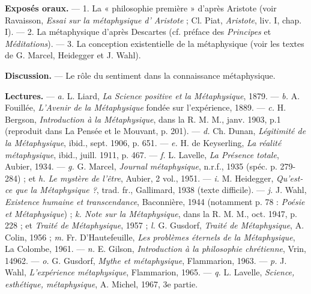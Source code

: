 {{\bf Exposés oraux.} — 1. La « philosophie première » d’après Aristote (voir
Ravaisson, {\it Essai sur la métaphysique d' Aristote} ; Cl. Piat, {\it Aristote}, liv. I,
chap. I). — 2. La métaphysique d’après Descartes (cf. préface des {\it Principes}
et {\it Méditations}). — 3. La conception existentielle de la métaphysique (voir
les textes de G. Marcel, Heidegger et J. Wahl).

{\bf Discussion.} — Le rôle du sentiment dans la connaissance métaphysique.

{\bf Lectures.} — {\it a.} L. Liard, {\it La Science positive et la Métaphysique}, 1879.
— {\it b.} A. Fouillée, {\it L'Avenir de la Métaphysique} fondée sur l'expérience,
1889. — {\it c.} H. Bergson, {\it Introduction à la Métaphysique}, dans la R. M. M.,
janv. 1903, p.1 (reproduit dans La Pensée et le Mouvant, p. 201). —
{\it d.} Ch. Dunan, {\it Légitimité de la Métaphysique}, ibid., sept. 1906, p. 651. —
{\it e.} H. de Keyserling, {\it La réalité métaphysique}, ibid., juill. 1911, p. 467. —
{\it f.} L. Lavelle, {\it La Présence totale}, Aubier, 1934. — {\it g.} G. Marcel, {\it Journal
métaphysique}, n.r.f., 1935 (spéc. p. 279-284) ; et {\it h. Le mystère de l'être}, Aubier,
2 vol., 1951. — {\it i.} M. Heidegger, {\it Qu'est-ce que la Métaphysique ?}, trad. fr.,
Gallimard, 1938 (texte difficile). — {\it j.} J. Wahl, {\it Existence humaine et
transcendance}, Baconnière, 1944 (notamment p. 78 : {\it Poésie et Métaphysique}) ;
{\it k. Note sur la Métaphysique}, dans la R. M. M., oct. 1947, p. 228 ; et {\it Traité
de Métaphysique}, 1957 ; {\it l.} G. Gusdorf, {\it Traité de Métaphysique}, A. Colin,
1956 ; {\it m.} Fr. D'Hautefeuille, {\it Les problèmes éternels de la Métaphysique},
La Colombe, 1961. — {\it n.} E. Gilson, {\it Introduction à la philosophie chrétienne},
Vrin, 14962. — {\it o.} G. Gusdorf, {\it Mythe et métaphysique}, Flammarion, 1963.
— {\it p.} J. Wahl, {\it L'expérience métaphysique}, Flammarion, 1965. — {\it q.}
L. Lavelle, {\it Science, esthétique, métaphysique}, A. Michel, 1967, 3e partie.
}
